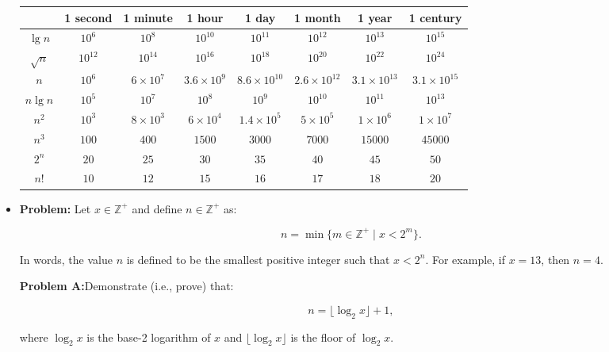 \documentclass{article}
\begin{document}
\begin{itemize}
\begin{center}
\begin{tabular}{|c|c|c|c|c|c|c|c|}
    \hline
    & \textbf{1 second} & \textbf{1 minute} & \textbf{1 hour} & \textbf{1 day} & \textbf{1 month} & \textbf{1 year} & \textbf{1 century} \\
    \hline
    \(\lg n\)       & \(10^6\) & \(10^{8}\) & \(10^{10}\) & \(10^{11}\) & \(10^{12}\) & \(10^{13}\) & \(10^{15}\) \\
    \hline
    \(\sqrt{n}\)    & \(10^{12}\) & \(10^{14}\) & \(10^{16}\) & \(10^{18}\) & \(10^{20}\) & \(10^{22}\) & \(10^{24}\) \\
    \hline
    \(n\)           & \(10^6\) & \(6 \times 10^7\) & \(3.6 \times 10^9\) & \(8.6 \times 10^{10}\) & \(2.6 \times 10^{12}\) & \(3.1 \times 10^{13}\) & \(3.1 \times 10^{15}\) \\
    \hline
    \(n \lg n\)     & \(10^5\) & \(10^7\) & \(10^8\) & \(10^9\) & \(10^{10}\) & \(10^{11}\) & \(10^{13}\) \\
    \hline
    \(n^2\)         & \(10^3\) & \(8 \times 10^3\) & \(6 \times 10^4\) & \(1.4 \times 10^5\) & \(5 \times 10^5\) & \(1 \times 10^6\) & \(1 \times 10^7\) \\
    \hline
    \(n^3\)         & \(100\) & \(400\) & \(1500\) & \(3000\) & \(7000\) & \(15000\) & \(45000\) \\
    \hline
    \(2^n\)         & \(20\) & \(25\) & \(30\) & \(35\) & \(40\) & \(45\) & \(50\) \\
    \hline
    \(n!\)          & \(10\) & \(12\) & \(15\) & \(16\) & \(17\) & \(18\) & \(20\) \\
    \hline
\end{tabular}
\end{center}


 \item \textbf{Problem:} Let \( x \in \mathbb{Z}^+ \) and define \( n \in \mathbb{Z}^+ \) as:

\[
n = \min \{ m \in \mathbb{Z}^+ \mid x < 2^m \}.
\]

In words, the value \( n \) is defined to be the smallest positive integer such that \( x < 2^n \). For example, if \( x = 13 \), then \( n = 4 \). 

\textbf{Problem A:}Demonstrate (i.e., prove) that:

\[
n = \lfloor \log_2 x \rfloor + 1,
\]

where \( \log_2 x \) is the base-2 logarithm of \( x \) and \( \lfloor \log_2 x \rfloor \) is the floor of \( \log_2 x \).


\end{itemize}
\end{document}
